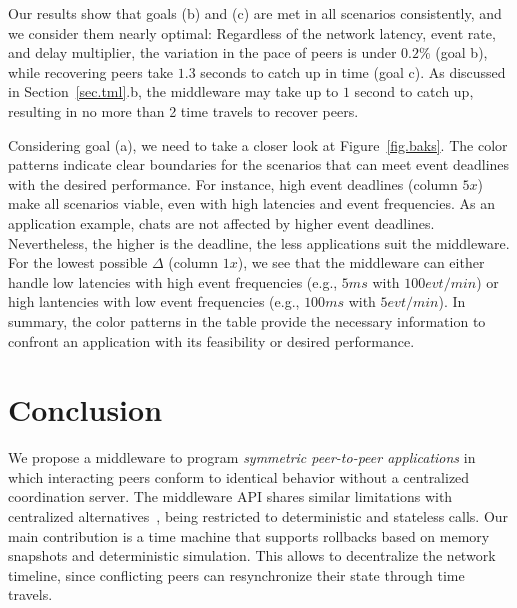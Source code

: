 \documentclass[12pt]{article}
\begin{document}

Our results show that goals (b) and (c) are met in all scenarios consistently,
and we consider them nearly optimal:
Regardless of the network latency, event rate, and delay multiplier,
    the variation in the pace of peers is under $0.2\%$ (goal b), while
    recovering peers take $1.3$ seconds to catch up in time (goal c).
As discussed in Section~\ref{sec.tml}.b, the middleware may take up to $1$
second to catch up, resulting in no more than 2 time travels to recover peers.

Considering goal (a), we need to take a closer look at Figure~\ref{fig.baks}.
The color patterns indicate clear boundaries for the scenarios that can meet
event deadlines with the desired performance.
%
For instance, high event deadlines (column $5x$) make all scenarios viable,
even with high latencies and event frequencies.
As an application example, chats are not affected by higher event deadlines.
Nevertheless, the higher is the deadline, the less applications suit the
middleware.
%
For the lowest possible $\Delta$ (column $1x$), we see that the middleware can
either handle low latencies with high event frequencies (e.g., $5ms$ with
$100evt/min$) or high lantencies with low event frequencies (e.g., $100ms$ with
$5evt/min$).
%
In summary, the color patterns in the table provide the necessary information
to confront an application with its feasibility or desired performance.


\section{Conclusion}
\label{sec.conclusion}

We propose a middleware to program \emph{symmetric peer-to-peer applications}
in which interacting peers conform to identical behavior without a centralized
coordination server.
%
The middleware API shares similar limitations with centralized
alternatives~\cite{gals,croquet}, being restricted to deterministic and
stateless calls. %
%
Our main contribution is a time machine that supports rollbacks based on memory
snapshots and deterministic simulation.
This allows to decentralize the network timeline, since conflicting peers can
resynchronize their state through time travels.
%
\end{document}
